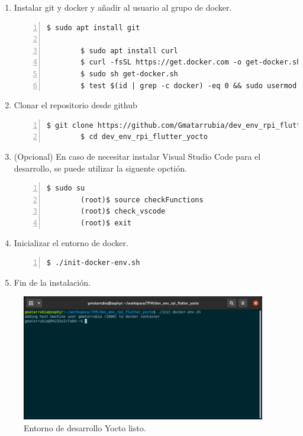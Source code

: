 \begin{enumerate}
    \item Instalar git y docker y añadir al usuario al grupo de docker.
    \begin{lstlisting}[style=consola, numbers=left]
        $ sudo apt install git

        $ sudo apt install curl
        $ curl -fsSL https://get.docker.com -o get-docker.sh
        $ sudo sh get-docker.sh
        $ test $(id | grep -c docker) -eq 0 && sudo usermod -aG docker $(whoami)
    \end{lstlisting}

    \item Clonar el repositorio desde github
    \begin{lstlisting}[style=consola, numbers=left]
        $ git clone https://github.com/Gmatarrubia/dev_env_rpi_flutter_yocto.git
        $ cd dev_env_rpi_flutter_yocto
    \end{lstlisting}

    \item (Opcional) En caso de necesitar instalar Visual Studio Code para el desarrollo,
    se puede utilizar la siguente opctión.
    \begin{lstlisting}[style=consola, numbers=left]
        $ sudo su
        (root)$ source checkFunctions
        (root)$ check_vscode
        (root)$ exit
    \end{lstlisting}

    \item Inicializar el entorno de docker.
    \begin{lstlisting}[style=consola, numbers=left]
        $ ./init-docker-env.sh
    \end{lstlisting}

    \item Fin de la instalación.
\end{enumerate}

\begin{figure}[H]
    \centering
    \includegraphics[width=0.95\textwidth]{imgs/yocto-docker-ready}
    \caption[yocto docker ready]{Entorno de desarrollo Yocto listo.}
    \label{imgs:yocto-docker-ready}
\end{figure}

